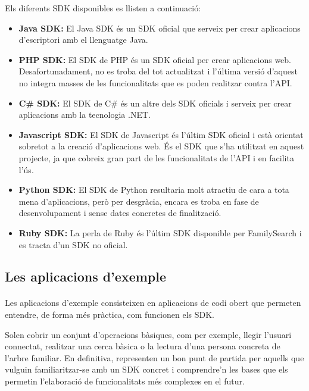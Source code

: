         Els diferents SDK disponibles es llisten a continuació:

        \begin{itemize}
            \item \textbf{Java SDK:} El Java SDK és un SDK oficial que serveix per crear aplicacions d'escriptori amb el llenguatge Java.
            \item \textbf{PHP SDK:} El SDK de PHP és un SDK oficial per crear aplicacions web. Desafortunadament, no es troba del tot actualitzat i l'última versió d'aquest no integra masses de les funcionalitats que es poden realitzar contra l'API.
            \item \textbf{C\# SDK:} El SDK de C\# és un altre dels SDK oficials i serveix per crear aplicacions amb la tecnologia .NET.
            \item \textbf{Javascript SDK:} El SDK de Javascript és l'últim SDK oficial i està orientat sobretot a la creació d'aplicacions web. És el SDK que s'ha utilitzat en aquest projecte, ja que cobreix gran part de les funcionalitats de l'API i en facilita l'ús.
            \item \textbf{Python SDK:} El SDK de Python resultaria molt atractiu de cara a tota mena d'aplicacions, però per desgràcia, encara es troba en fase de desenvolupament i sense dates concretes de finalització.
            \item \textbf{Ruby SDK:} La perla de Ruby és l'últim SDK disponible per FamilySearch i es tracta d'un SDK no oficial.
        \end{itemize}


    \subsection{Les aplicacions d'exemple}

        \paragraph{}
        Les aplicacions d'exemple consisteixen en aplicacions de codi obert que permeten entendre, de forma més pràctica, com funcionen els SDK.

        Solen cobrir un conjunt d'operacions bàsiques, com per exemple, llegir l'usuari connectat, realitzar una cerca bàsica o la lectura d'una persona concreta de l'arbre familiar. En definitiva, representen un bon punt de partida per aquells que vulguin familiaritzar-se amb un SDK concret i comprendre'n les bases que els permetin l'elaboració de funcionalitats més complexes en el futur.

